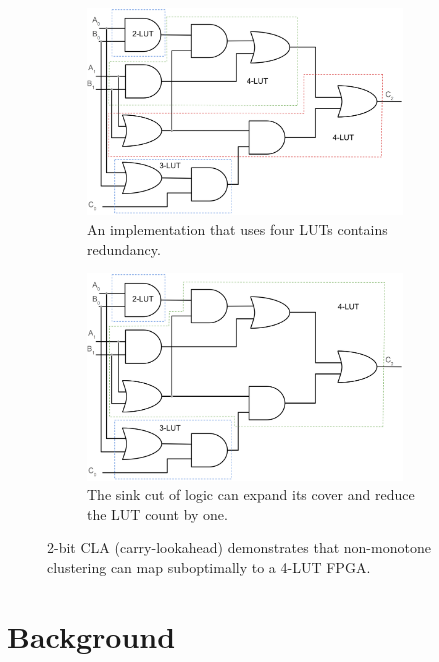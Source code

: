 \begin{figure}[tb]
    \begin{subfigure}{0.49\textwidth}
        \centering
        \includegraphics[width=0.92\textwidth]{img/cla_bad.png}
        \caption{An implementation that uses four LUTs contains redundancy.}\label{fig:eg:bad}
    \end{subfigure}
    \hfill
    \begin{subfigure}{0.49\textwidth}
        \centering
        \includegraphics[width=0.92\textwidth]{img/cla_good.png}
        \caption{The sink cut of logic can expand its cover and reduce the LUT count by one.}\label{fig:eg:good}
    \end{subfigure}
    \caption{2-bit CLA (carry-lookahead) demonstrates that non-monotone clustering can map suboptimally to a 4-LUT FPGA.}\label{fig:eg}
\end{figure}

\section{Background}\label{sec:background}

